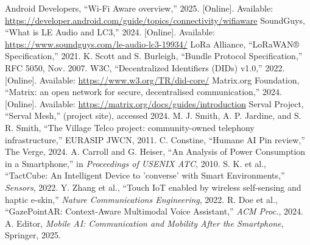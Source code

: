 \documentclass[10pt,journal,compsoc]{IEEEtran}
\begin{document}
\begin{thebibliography}{99}
 Android Developers, ``Wi-Fi Aware overview,'' 2025. [Online]. Available: \url{https://developer.android.com/guide/topics/connectivity/wifiaware}
 SoundGuys, ``What is LE Audio and LC3,'' 2024. [Online]. Available: \url{https://www.soundguys.com/le-audio-lc3-19934/}
 LoRa Alliance, ``LoRaWAN® Specification,'' 2021.
 K. Scott and S. Burleigh, ``Bundle Protocol Specification,'' RFC 5050, Nov. 2007.
 W3C, ``Decentralized Identifiers (DIDs) v1.0,'' 2022. [Online]. Available: \url{https://www.w3.org/TR/did-core/}
 Matrix.org Foundation, ``Matrix: an open network for secure, decentralised communication,'' 2024. [Online]. Available: \url{https://matrix.org/docs/guides/introduction}
 Serval Project, ``Serval Mesh,'' (project site), accessed 2024.
 M. J. Smith, A. P. Jardine, and S. R. Smith, ``The Village Telco project: community-owned telephony infrastructure,'' EURASIP JWCN, 2011.
 C. Constine, ``Humane AI Pin review,'' The Verge, 2024.
 A. Carroll and G. Heiser, ``An Analysis of Power Consumption in a Smartphone,'' in \textit{Proceedings of USENIX ATC}, 2010.
 S. K. et al., ``TactCube: An Intelligent Device to 'converse' with Smart Environments,'' \textit{Sensors}, 2022.
 Y. Zhang et al., ``Touch IoT enabled by wireless self-sensing and haptic e-skin,'' \textit{Nature Communications Engineering}, 2022.
 R. Doe et al., ``GazePointAR: Context-Aware Multimodal Voice Assistant,'' \textit{ACM Proc.}, 2024.
 A. Editor, \textit{Mobile AI: Communication and Mobility After the Smartphone}, Springer, 2025.
\end{thebibliography}
\end{document}
